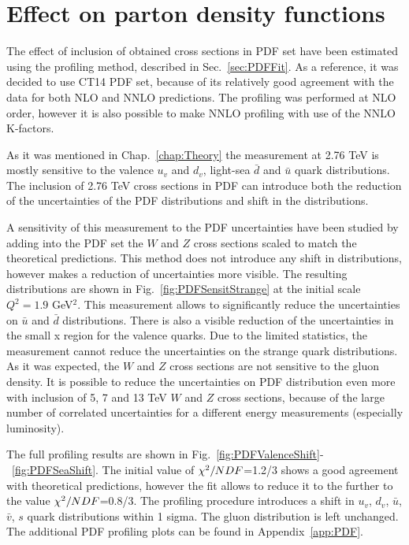 \section{Effect on parton density functions}\label{sec:PDFCs}

The effect of inclusion of obtained cross sections in PDF set have been estimated using the profiling method, described in Sec.~\ref{sec:PDFFit}. As a reference, it was decided to use CT14 PDF set, because of its relatively good agreement with the data for both NLO and NNLO predictions. The profiling was performed at NLO order, however it is also possible to make NNLO profiling with use of the NNLO K-factors.

As it was mentioned in Chap.~\ref{chap:Theory} the measurement at 2.76 TeV is mostly sensitive to the valence $u_v$ and $d_v$, light-sea $\bar{d}$ and $\bar{u}$ quark distributions. The inclusion of 2.76 TeV cross sections in PDF can introduce both the reduction of the uncertainties of the PDF distributions and shift in the distributions. 

A sensitivity of this measurement to the PDF uncertainties have been studied by adding into the PDF set the $W$ and $Z$ cross sections scaled to match the theoretical predictions. This method does not introduce any shift in distributions, however makes a reduction of uncertainties more visible. The resulting distributions are shown in Fig.~\ref{fig:PDFSensitStrange} at the initial scale $Q^2=1.9$ GeV$^2$. This measurement allows to significantly reduce the uncertainties on $\bar{u}$ and $\bar{d}$ distributions. There is also a visible reduction of the uncertainties in the small x region for the valence quarks. Due to the limited statistics, the measurement cannot reduce the uncertainties on the strange quark distributions. As it was expected, the $W$ and $Z$ cross sections are not sensitive to the gluon density. It is possible to reduce the uncertainties on PDF distribution even more with inclusion of 5, 7 and 13 TeV $W$ and $Z$ cross sections, because of the large number of correlated uncertainties for a different energy measurements (especially luminosity).

The full profiling results are shown in Fig.~\ref{fig:PDFValenceShift}-~\ref{fig:PDFSeaShift}. The initial value of $\chi^2/NDF$=1.2/3 shows a good agreement with theoretical predictions, however the fit allows to reduce it to the further to the value $\chi^2/NDF$=0.8/3. The profiling procedure introduces a shift in $u_v$, $d_v$, $\bar{u}$, $\bar{v}$, $s$ quark distributions within 1 sigma.  The gluon distribution is left unchanged. The additional PDF profiling plots can be found in Appendix~\ref{app:PDF}.

